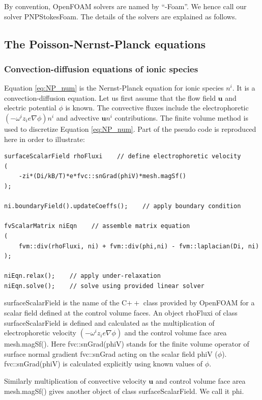 By convention, OpenFOAM solvers are named by ``-Foam''. We hence call our solver PNPStokesFoam. The details of the solvers are explained as follows.

\subsection{The Poisson-Nernst-Planck equations}
\subsubsection{Convection-diffusion equations of ionic species}
Equation \ref{eq:NP_num} is the Nernst-Planck equation for ionic species $n^i$. It is a convection-diffusion equation. Let us first assume that the flow field $\mathbf{u}$ and electric potential $\phi$ is known. The convective fluxes include the electrophoretic  $(-\omega^iz_ie\nabla\phi)n^i$ and advective $\mathbf{u}n^i$ contributions. The finite volume method is used to discretize Equation \ref{eq:NP_num}. Part of the pseudo code is reproduced here in order to illustrate:

\begin{lstlisting}
surfaceScalarField rhoFluxi    // define electrophoretic velocity
(
	-zi*(Di/kB/T)*e*fvc::snGrad(phiV)*mesh.magSf()
);

ni.boundaryField().updateCoeffs();    // apply boundary condition

fvScalarMatrix niEqn    // assemble matrix equation
(
    fvm::div(rhoFluxi, ni) + fvm::div(phi,ni) - fvm::laplacian(Di, ni)
);  
      
niEqn.relax();    // apply under-relaxation
niEqn.solve();    // solve using provided linear solver
\end{lstlisting}

\textsf{surfaceScalarField} is the name of the C$++$ class provided by OpenFOAM for a scalar field defined at the control volume faces. An object \textsf{rhoFluxi} of class \textsf{surfaceScalarField} is defined and calculated as the multiplication of electrophoretic velocity $(-\omega^iz_ie\nabla\phi)$ and the control volume face area \textsf{mesh.magSf()}. Here \textsf{fvc::snGrad(phiV)} stands for the finite volume operator of surface normal gradient \textsf{fvc::snGrad} acting on the scalar field \textsf{phiV} ($\phi$). \textsf{fvc::snGrad(phiV)} is calculated explicitly using known values of $\phi$. 

Similarly multiplication of convective velocity $\mathbf{u}$ and control volume face area \textsf{mesh.magSf()} gives another object of class \textsf{surfaceScalarField}. We call it \textsf{phi}.

